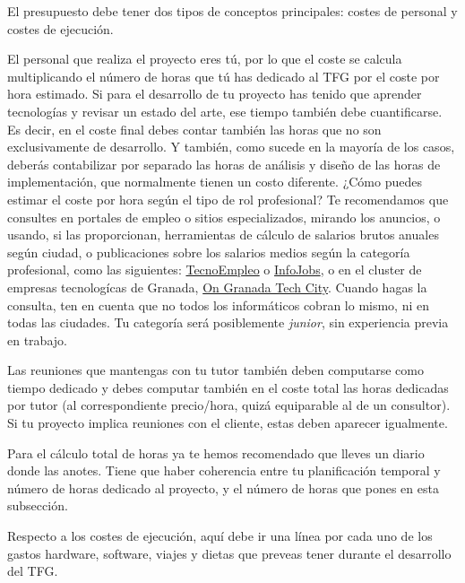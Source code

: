 El presupuesto debe tener dos tipos de conceptos principales: costes de personal y costes de ejecución.

El personal que realiza el proyecto eres tú, por lo que el coste se calcula multiplicando el número de horas que tú has dedicado al TFG por el coste por hora estimado. Si para el desarrollo de tu proyecto has tenido que aprender tecnologías y revisar un estado del arte, ese tiempo también debe cuantificarse. Es decir, en el coste final debes contar también las horas que no son exclusivamente de desarrollo. Y también, como sucede en la mayoría de los casos, deberás contabilizar por separado las horas de análisis y diseño de las horas de implementación, que normalmente tienen un costo diferente. ¿Cómo puedes estimar el coste por hora según el tipo de rol profesional? Te recomendamos que consultes en portales de empleo o sitios especializados, mirando los anuncios, o usando, si las proporcionan, herramientas de cálculo de salarios brutos anuales según ciudad, o publicaciones sobre los salarios medios según la categoría profesional, como las siguientes: \href{https://www.tecnoempleo.com/ofertas-trabajo/}{TecnoEmpleo} o \href{https://www.tecnoempleo.com/ofertas-trabajo/}{InfoJobs}, o en el cluster de empresas tecnologícas de Granada, \href{https://www.ontechinnovation.com/bolsa-de-trabajo/}{On Granada Tech City}. Cuando hagas la consulta, ten en cuenta que no todos los informáticos cobran lo mismo, ni en todas las ciudades. Tu categoría será posiblemente \textit{junior}, sin experiencia previa en trabajo. 

Las reuniones que mantengas con tu tutor también deben computarse como tiempo dedicado y debes computar también en el coste total las horas dedicadas por tutor (al correspondiente precio/hora, quizá equiparable al de un consultor). Si tu proyecto implica reuniones con el cliente, estas deben aparecer igualmente.

Para el cálculo total de horas ya te hemos recomendado que lleves un diario donde las anotes. Tiene que haber coherencia entre tu planificación temporal y número de horas dedicado al proyecto, y el número de horas que pones en esta subsección.

Respecto a los costes de ejecución, aquí debe ir una línea por cada uno de los gastos hardware, software, viajes y dietas que preveas tener durante el desarrollo del TFG. 

